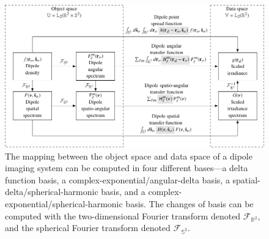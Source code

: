 \documentclass[]{osa-article}
\providecommand{\mbb}[1]{\mathbb{#1}}
\begin{document}
  \begin{figure}
  \hspace{-5em}
  \includegraphics[scale=1.0]{../figures/dipole-block/dipole-block.pdf}
  \caption{The mapping between the object space and data space of a dipole
    imaging system can be computed in four different bases---a delta function
    basis, a complex-exponential/angular-delta basis, a
    spatial-delta/spherical-harmonic basis, and a
    complex-exponential/spherical-harmonic basis. The changes of basis can be
    computed with the two-dimensional Fourier transform denoted
    $\mathcal{F}_{\mbb{R}^2}$, and the spherical Fourier transform denoted
    $\mathcal{F}_{\mbb{S}^2}$.}
   \label{fig:dipole-block}      
    \end{figure}
\end{document}
